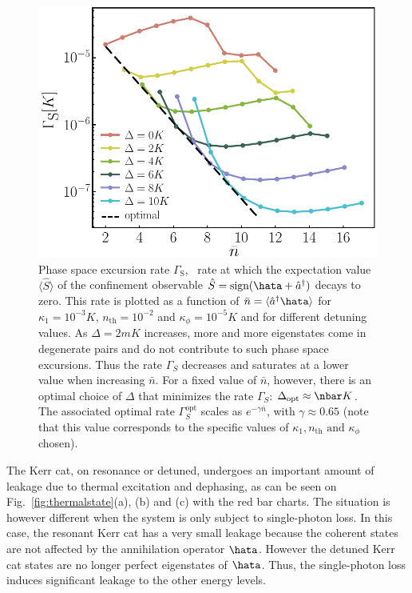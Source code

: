 \begin{figure}[t!]
    \centering
    \includegraphics[width=\columnwidth]{file/image/Bitflip_V2.pdf}
    \vspace{-0.5cm}
    \caption{\label{fig:bitflip}
         Phase space excursion rate $\Gamma_\text{S}$, \ie~rate at which the expectation value $\langle \hat S \rangle$ of the confinement observable $\hat S=\textrm{sign}(\hata+\hat{a}^{\dagger})$ decays to zero. This rate is plotted as a function of $\bar{n} = \langle\hat{a}^{\dagger} \hata\rangle$ for $\kappa_1 = 10^{-3}K$, $n_{\text{th}}=10^{-2}$ and $\kappa_\phi = 10^{-5}K$ and  for different detuning values. As $\Delta=2mK$ increases, more and more eigenstates come in degenerate pairs and do not contribute to such phase space excursions. Thus the rate $\Gamma_S$ decreases and saturates at a lower value when increasing $\bar n$. For a fixed value of $\bar n$, however, there is an optimal choice of $\Delta$ that minimizes the rate $\Gamma_S$: $\Delta_{\text{opt}} \approx \nbar K$. The associated optimal rate $\Gamma^{\text{opt}}_S$ scales as $e^{-\gamma\bar n}$, with $\gamma\approx 0.65$ (note that this value corresponds to the specific values of $\kappa_1,n_{\text{th}} \text{ and } \kappa_\phi$ chosen).
    }
\end{figure}

The Kerr cat, on resonance or detuned, undergoes an important amount of leakage due to thermal excitation and dephasing, as can be seen on Fig.~\ref{fig:thermalstate}(a), (b) and (c) with the red bar charts. The situation is however different when the system is only subject to  single-photon loss. In this case, the resonant Kerr cat has a very small leakage because the coherent states are not affected by the annihilation operator $\hata$. However the detuned Kerr cat states are no longer perfect eigenstates of  $\hata$. Thus, the single-photon loss induces significant leakage to the other energy levels. 

